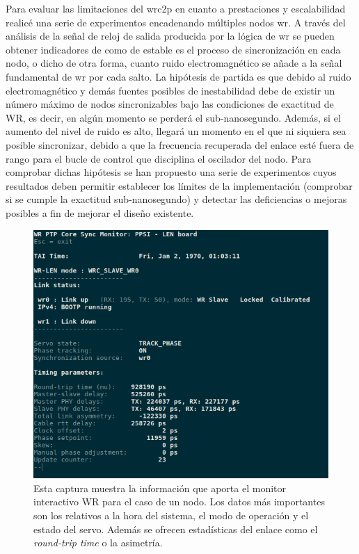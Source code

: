 Para evaluar las limitaciones del \gls{wrc2p} en cuanto a prestaciones y 
escalabilidad realicé una serie de experimentos encadenando múltiples nodos 
\gls{wr}. A través del análisis de la señal de reloj de salida producida por 
la lógica de \gls{wr} se pueden obtener indicadores de como de estable es el 
proceso de sincronización en cada nodo, o dicho de otra forma, cuanto ruido 
electromagnético se añade a la señal fundamental de \gls{wr} por cada salto. La 
hipótesis de partida es que debido al ruido electromagnético y demás fuentes 
posibles de inestabilidad debe de existir un número máximo de nodos 
sincronizables bajo las condiciones de exactitud de WR, es decir, en algún 
momento se perderá el sub-nanosegundo. Además, si el aumento del nivel de ruido 
es alto, llegará un momento en el que ni siquiera sea posible sincronizar, 
debido a que la frecuencia recuperada del enlace esté fuera de rango para el 
bucle de control que disciplina el oscilador del nodo. Para comprobar dichas 
hipótesis se han propuesto una serie de experimentos cuyos resultados deben 
permitir establecer los límites de la implementación 
(comprobar si se cumple la exactitud sub-nanosegundo) y detectar las 
deficiencias o mejoras posibles a fin de mejorar el diseño existente.

\begin{figure}
	\centering
	\includegraphics[width=0.7\linewidth]{imagenes/len_gui}
	\caption[Captura del monitor WR en el dispositivo WR-LEN]{Esta captura 
	muestra la información que aporta el monitor interactivo WR para el caso de 
	un nodo. Los datos más importantes son los relativos a la hora del sistema, 
	el modo de operación y el estado del servo. Además se ofrecen estadísticas 
	del enlace como el \textit{round-trip time} o la asimetría.}
	\label{fig:lengui}
\end{figure}


